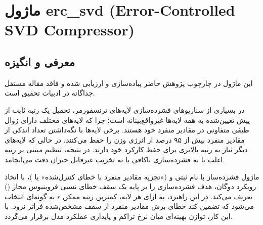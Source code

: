 \section{ماژول erc\_svd (Error-Controlled SVD Compressor)}
\label{sec:module_erc_svd}

\subsection{معرفی و انگیزه}
این ماژول در چارچوب پژوهش حاضر پیاده‌سازی و ارزیابی شده و فاقد مقاله مستقل جداگانه در ادبیات تحقیق است.

در بسیاری از سناریوهای فشرده‌سازی لایه‌های ترنسفورمر، تحمیل یک رتبه ثابت از پیش تعیین‌شده به همه لایه‌ها غیرواقع‌بینانه است؛ چرا که لایه‌های مختلف دارای زوال طیفی متفاوتی در مقادیر منفرد خود هستند. برخی لایه‌ها با نگه‌داشتن تعداد اندکی از مقادیر منفرد بیش از ۹۵ درصد از انرژی وزن را حفظ می‌کنند، در حالی که لایه‌های دیگر نیاز به رتبه بالاتری برای حفظ کارکرد خود دارند. در نتیجه، تنظیم مبتنی بر رتبه اغلب یا به فشرده‌سازی ناکافی یا به تخریب غیرقابل جبران دقت می‌انجامد.

ماژول فشرده‌ساز  با نام ثبتی  و  («تجزیه مقادیر منفرد با خطای کنترل‌شده» یا )، با اتخاذ رویکرد دوگان، هدف فشرده‌سازی را بر پایه یک سقف خطای نسبی فروبنیوس مجاز () تعریف می‌کند. در این راهبرد، به ازای هر لایه، کمترین رتبه ممکن $r$ به گونه‌ای انتخاب می‌شود که تضمین کند خطای برش مقادیر منفرد از سقف مشخص‌شده فراتر نرود. با این کار، توازن بهینه‌ای میان نرخ تراکم و پایداری عملکرد مدل برقرار می‌گردد.

